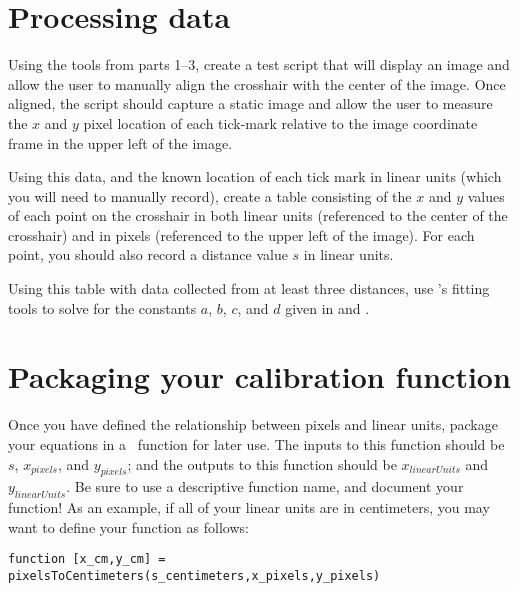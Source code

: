 \documentclass{tufte-handout}
\begin{document}
\section{Processing data}
Using the tools from parts 1--3, create a test script that will display an image and allow the user to manually align the crosshair with the center of the image. Once aligned, the script should capture a static image and allow the user to measure the $x$ and $y$ pixel location of each tick-mark relative to the image coordinate frame in the upper left of the image. 

Using this data, and the known location of each tick mark in linear units (which you will need to manually record), create a table consisting of the $x$ and $y$ values of each point on the crosshair in both linear units (referenced to the center of the crosshair) and in pixels (referenced to the upper left of the image). For each point, you should also record a distance value $s$ in linear units.

Using this table with data collected from at least three distances, use \Matlab's fitting tools to solve for the constants $a$, $b$, $c$, and $d$ given in  and .


\section{Packaging your calibration function}
Once you have defined the relationship between pixels and linear units, package your equations in a \Matlab\ function for later use. The inputs to this function should be $s$, $x_{pixels}$, and $y_{pixels}$; and the outputs to this function should be $x_{linearUnits}$ and $y_{linearUnits}$. Be sure to use a descriptive function name, and document your function! As an example, if all of your linear units are in centimeters, you may want to define your function as follows:
\begin{lstlisting}[style=usnaMatlab]
function [x_cm,y_cm] = pixelsToCentimeters(s_centimeters,x_pixels,y_pixels)
\end{lstlisting}

\clearpage
\end{document}
